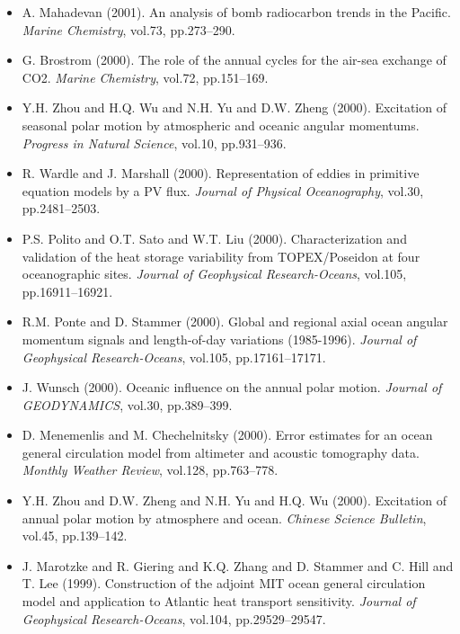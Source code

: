 \begin{itemize}
\item A. Mahadevan (2001). An analysis of bomb radiocarbon trends in the
Pacific. {\it Marine Chemistry}, vol.73, pp.273--290. 


\item G. Brostrom (2000). The role of the annual cycles for the air-sea
exchange of CO2. {\it Marine Chemistry}, vol.72, pp.151--169. 

\item Y.H. Zhou and H.Q. Wu and N.H. Yu and D.W. Zheng (2000). Excitation
of seasonal polar motion by atmospheric and oceanic angular momentums.
{\it Progress in Natural Science}, vol.10, pp.931--936. 

\item R. Wardle and J. Marshall (2000). Representation of eddies in
primitive equation models by a PV flux. {\it Journal of Physical
Oceanography}, vol.30, pp.2481--2503. 

\item P.S. Polito and O.T. Sato and W.T. Liu (2000). Characterization and
validation of the heat storage variability from TOPEX/Poseidon at four
oceanographic sites. {\it Journal of Geophysical Research-Oceans}, vol.105,
pp.16911--16921. 

\item R.M. Ponte and D. Stammer (2000). Global and regional axial ocean
angular momentum signals and length-of-day variations (1985-1996).
{\it Journal of Geophysical Research-Oceans}, vol.105, pp.17161--17171. 

\item J. Wunsch (2000). Oceanic influence on the annual polar motion.
{\it Journal of GEODYNAMICS}, vol.30, pp.389--399. 

\item D. Menemenlis and M. Chechelnitsky (2000). Error estimates for an
ocean general circulation model from altimeter and acoustic tomography
data. {\it Monthly Weather Review}, vol.128, pp.763--778. 

\item Y.H. Zhou and D.W. Zheng and N.H. Yu and H.Q. Wu (2000). Excitation
of annual polar motion by atmosphere and ocean. {\it Chinese Science
Bulletin}, vol.45, pp.139--142. 

\item J. Marotzke and R. Giering and K.Q. Zhang and D. Stammer and C. Hill
and T. Lee (1999). Construction of the adjoint MIT ocean general
circulation model and application to Atlantic heat transport
sensitivity. {\it Journal of Geophysical Research-Oceans}, vol.104,
pp.29529--29547. 


\end{itemize}
